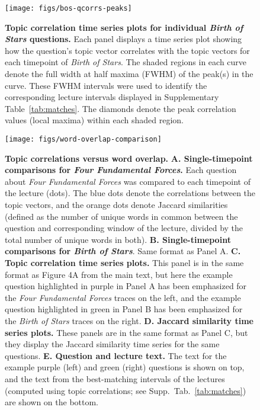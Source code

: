 \documentclass[10pt]{article}
\begin{document}
\begin{figure}[tp]
    \centering
    \texttt{[image: figs/bos-qcorrs-peaks]}

    \caption{\textbf{Topic correlation time series plots for individual
    \textit{Birth of Stars} questions.} Each panel displays a
    time series plot showing how the question's topic vector correlates with the
    topic vectors for each timepoint of \textit{Birth of Stars}. The
    shaded regions in each curve denote the full width at half maxima (FWHM)
    of the peak(s) in the curve. These FWHM intervals were used to identify the
    corresponding lecture intervals displayed in Supplementary
    Table~\ref{tab:matches}. The diamonds denote the peak correlation values
    (local maxima) within each shaded region.}

    \label{fig:bos-peaks}
\end{figure}


\begin{figure}[tp]
    \centering
    \texttt{[image: figs/word-overlap-comparison]}

    \caption{\textbf{Topic correlations versus word overlap.} \textbf{A.
    Single-timepoint comparisons for \textit{Four Fundamental Forces}.} Each
    question about \textit{Four Fundamental Forces} was compared to each
    timepoint of the lecture (dots). The blue dots denote the correlations
    between the topic vectors, and the orange dots denote Jaccard similarities
    (defined as the number of unique words in common between the question and
    corresponding window of the lecture, divided by the total number of unique
    words in both). \textbf{B. Single-timepoint comparisons for \textit{Birth
    of Stars}}. Same format as Panel A. \textbf{C. Topic correlation time series
    plots.} This panel is in the same format as Figure 4A from the main text,
    but here the example question highlighted in purple in Panel A has been
    emphasized for the \textit{Four Fundamental Forces} traces on the left, and
    the example question highlighted in green in Panel B has been emphasized
    for the \textit{Birth of Stars} traces on the right. \textbf{D. Jaccard
    similarity time series plots.} These panels are in the same format as Panel
    C, but they display the Jaccard similarity time series for the same
    questions. \textbf{E. Question and lecture text.} The text for the example
    purple (left) and green (right) questions is shown on top, and the text
    from the best-matching intervals of the lectures (computed using topic
    correlations; see Supp.~Tab.~\ref{tab:matches}) are shown on the bottom.}


    \label{fig:compare-wordcount}
\end{figure}
\end{document}

